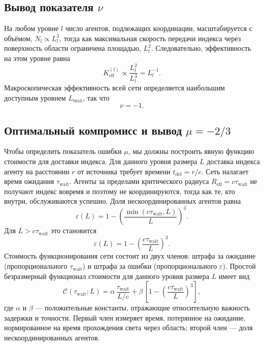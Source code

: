 \documentclass[11pt,a4paper]{article}
\begin{document}
	\subsection{Вывод показателя \(\nu\)}
	На любом уровне \(l\) число агентов, подлежащих координации, масштабируется с объёмом, \(N_l \propto L_l^3\), тогда как максимальная скорость передачи индекса через поверхность области ограничена площадью, \(L_l^2\). Следовательно, эффективность на этом уровне равна
	\[
	K_{\mathrm{eff}}^{(l)} \propto \frac{L_l^2}{L_l^3} = L_l^{-1}.
	\]
	Макроскопическая эффективность всей сети определяется наибольшим доступным уровнем \(L_{\max}\), так что
	\[
	\nu = -1. \label{eq:nu}
	\]
	
	\subsection{Оптимальный компромисс и вывод \(\mu = -2/3\)}
	Чтобы определить показатель ошибки \(\mu\), мы должны построить явную функцию стоимости для доставки индекса. Для данного уровня размера \(L\) доставка индекса агенту на расстоянии \(r\) от источника требует времени \(t_{\mathrm{del}} = r/c\). Сеть налагает время ожидания \(\tau_{\mathrm{wait}}\). Агенты за пределами критического радиуса \(R_{\mathrm{eff}} = c\tau_{\mathrm{wait}}\) не получают индекс вовремя и поэтому не координируются, тогда как те, кто внутри, обслуживаются успешно. Доля нескоординированных агентов равна
	\[
	\varepsilon(L) = 1 - \left(\frac{\min(c\tau_{\mathrm{wait}},L)}{L}\right)^3.
	\]
	Для \(L > c\tau_{\mathrm{wait}}\) это становится
	\[
	\varepsilon(L) = 1 - \left(\frac{c\tau_{\mathrm{wait}}}{L}\right)^3.
	\]
	Стоимость функционирования сети состоит из двух членов: штрафа за ожидание (пропорционального \(\tau_{\mathrm{wait}}\)) и штрафа за ошибки (пропорционального \(\varepsilon\)). Простой безразмерный функционал стоимости для данного уровня размера \(L\) имеет вид
	\begin{equation}
		\mathcal{C}(\tau_{\mathrm{wait}}; L) = \alpha\, \frac{\tau_{\mathrm{wait}}}{L/c} + \beta\,\left[1 - \left(\frac{c\tau_{\mathrm{wait}}}{L}\right)^3\right],
		\label{eq:cost}
	\end{equation}
	где \(\alpha\) и \(\beta\) — положительные константы, отражающие относительную важность задержки и точности. Первый член измеряет время, потерянное на ожидание, нормированное на время прохождения света через область; второй член — доля нескоординированных агентов.
	
\end{document}
